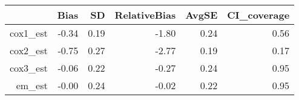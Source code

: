 \begin{table}[ht]
\centering
\begin{tabular}{rrrrrr}
  \hline
 & Bias & SD & RelativeBias & AvgSE & CI\_coverage \\ 
  \hline
cox1\_est & -0.34 & 0.19 & -1.80 & 0.24 & 0.56 \\ 
  cox2\_est & -0.75 & 0.27 & -2.77 & 0.19 & 0.17 \\ 
  cox3\_est & -0.06 & 0.22 & -0.27 & 0.24 & 0.95 \\ 
  em\_est & -0.00 & 0.24 & -0.02 & 0.22 & 0.95 \\ 
   \hline
\end{tabular}
\end{table}
